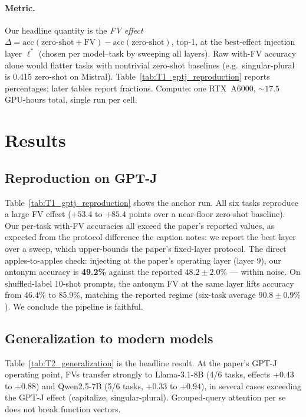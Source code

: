 \documentclass[11pt]{article}
\begin{document}
\paragraph{Metric.} Our headline quantity is the \emph{FV effect}
$\Delta = \text{acc}(\text{zero-shot} + \text{FV}) -
\text{acc}(\text{zero-shot})$, top-1, at the best-effect injection layer
$\ell^*$ (chosen per model--task by sweeping all layers). Raw with-FV
accuracy alone would flatter tasks with nontrivial zero-shot baselines
(e.g.\ singular-plural is 0.415 zero-shot on Mistral).
Table~\ref{tab:T1_gptj_reproduction} reports percentages; later tables
report fractions. Compute: one RTX~A6000, ${\sim}17.5$ GPU-hours total,
single run per cell.




\section{Results}

\subsection{Reproduction on GPT-J}
\label{sec:repro}

Table~\ref{tab:T1_gptj_reproduction} shows the anchor run. All six tasks
reproduce a large FV effect ($+53.4$ to $+85.4$ points over a near-floor
zero-shot baseline). Our per-task with-FV accuracies all exceed the paper's
reported values, as expected from the protocol difference the caption
notes: we report the best layer over a sweep, which upper-bounds the
paper's fixed-layer protocol. The direct apples-to-apples check: injecting
at the paper's operating layer (layer 9), our antonym accuracy is
\textbf{49.2\%} against the reported $48.2 \pm 2.0\%$
\citep{todd2024function} --- within noise. On shuffled-label 10-shot
prompts, the antonym FV at the same layer lifts accuracy from 46.4\% to
85.9\%, matching the reported regime (six-task average $90.8 \pm 0.9\%$).
We conclude the pipeline is faithful.

\subsection{Generalization to modern models}
\label{sec:gen}

Table~\ref{tab:T2_generalization} is the headline result. At the paper's
GPT-J operating point, FVs transfer strongly to Llama-3.1-8B (4/6 tasks, effects
$+0.43$ to $+0.88$) and Qwen2.5-7B (5/6 tasks, $+0.33$ to $+0.94$), in
several cases exceeding the GPT-J effect (capitalize, singular-plural).
Grouped-query attention per se does not break function vectors.
\end{document}
